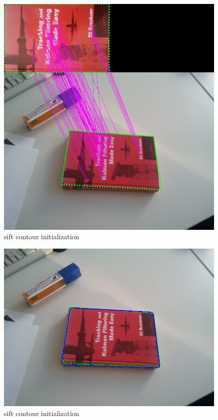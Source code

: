 \begin{figure}[htbp]
  \centering
\includegraphics[width=\linewidth]{images/sift.png}
  \caption{sift contour initialization}
  \label{"waiting for reftex-label call..."}
\end{figure}

\begin{figure}[htbp]
  \centering
\includegraphics[width=\linewidth]{images/sift_result.png}
  \caption{sift contour initialization}
  \label{"waiting for reftex-label call..."}
\end{figure}
